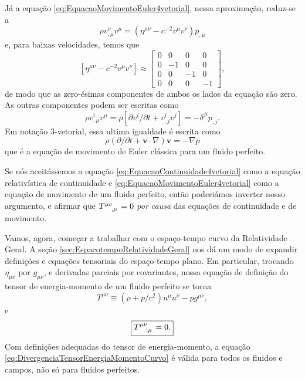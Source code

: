 Já a equação \eqref{eq:EquacaoMovimentoEuler4vetorial}, nessa aproximação, reduz-se a 
\[
	\rho v_{, \mu}^{\nu} v^{\mu}=\left(\eta^{\mu \nu}-c^{-2} v^{\mu} v^{\nu}\right) p_{, \mu}
\]
e, para baixas velocidades, temos que
{\small
\[
\left[\eta^{\mu \nu}-c^{-2} v^{\mu} v^{\nu}\right] \approx
\left[\begin{array}{rrrr}{0} & {0} & {0} & {0} \\ {0} & {-1} & {0} & {0} \\ {0} & {0} & {-1} & {0} \\ {0} & {0} & {0} & {-1}\end{array}\right],
\]
}
de modo que as zero-ésimas componentes de ambos os lados da equação são zero. As outras componentes podem ser escritas como
\[
	\rho v^{i}_{, \mu}v^{\mu}= \rho\left[\partial v^{i} / \partial t+v_{, j}^{i} v^{j}\right]=-\delta^{j i} p_{, j} .\]
Em notação 3-vetorial, essa ultima igualdade é escrita como
\begin{equation}\label{eq:EquacaoMovimentoEulerClassica3vetorial}
	\boxed{
		\rho(\partial / \partial t+\mathbf{v} \cdot \nabla) \mathbf{v}=-\nabla p
	}
\end{equation}
que é a equação de movimento de Euler clássica para um fluido perfeito.

Se nós aceitássemos a equação \eqref{eq:EquacaoContinuidade4vetorial} como a equação relativística de continuidade e \eqref{eq:EquacaoMovimentoEuler4vetorial} como a equação de movimento de um fluido perfeito, então poderiámos inverter nosso argumento, e afirmar que $\tensor{T}{^{\mu\nu}_{,\mu}}=0$ \textit{por causa} das equações de continuidade e de movimento.

Vamos, agora, começar a trabalhar com o espaço-tempo curvo da Relatividade Geral. A seção \ref{sec:EspacotempoRelatividadeGeral} nos dá um modo de expandir definições e equações tensoriais do espaço-tempo plano. Em particular, trocando $\eta_{\mu\nu}$ por $g_{\mu\nu}$, e derivadas parciais por covariantes, nossa equação de definição do tensor de energia-momento de um fluido perfeito se torna
\begin{equation}\label{eq:TensorEnergiaMomentoCurvo}
	\boxed{
	T^{\mu\nu} \equiv (\rho+p/c^2)u^\mu u^\nu - pg^{\mu\nu} ,
	}
\end{equation}
e 
\begin{equation}\label{eq:DivergenciaTensorEnergiaMomentoCurvo}
	\boxed{ 
	\tensor{T}{^\mu^\nu_{;\mu}}=0 .
	} 
\end{equation}
Com definições adequadas do tensor de energia-momento, a equação \eqref{eq:DivergenciaTensorEnergiaMomentoCurvo} é válida para todos os fluidos e campos, não só para fluidos perfeitos. 

